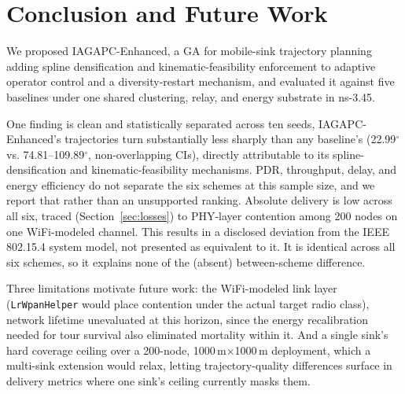\documentclass[runningheads]{llncs}
\begin{document}
\section{Conclusion and Future Work}
\label{sec:conclusion}

We proposed IAGAPC-Enhanced, a GA for mobile-sink trajectory planning
adding spline densification and kinematic-feasibility enforcement to
adaptive operator control and a diversity-restart mechanism, and evaluated
it against five baselines under one shared clustering, relay, and energy
substrate in ns-3.45.

One finding is clean and statistically separated across ten seeds,
IAGAPC-Enhanced's trajectories turn substantially less sharply than any
baseline's (22.99$^\circ$ vs. 74.81--109.89$^\circ$, non-overlapping CIs),
directly attributable to its spline-densification and
kinematic-feasibility mechanisms. PDR, throughput, delay, and energy
efficiency do not separate the six schemes at this sample size, and we
report that rather than an unsupported ranking. Absolute delivery is low
across all six, traced (Section~\ref{sec:losses}) to PHY-layer contention
among 200 nodes on one WiFi-modeled channel. This results in a disclosed deviation
from the IEEE 802.15.4 system model, not presented as equivalent to it. It
is identical across all six schemes, so it explains none of the (absent)
between-scheme difference.

Three limitations motivate future work: the WiFi-modeled link layer
(\texttt{LrWpanHelper} would place contention under the actual target radio
class), network lifetime unevaluated at this horizon, since the energy
recalibration needed for tour survival also eliminated mortality within it. And a single sink's hard coverage ceiling over a 200-node,
1000\,m$\times$1000\,m deployment, which a multi-sink extension would
relax, letting trajectory-quality differences surface in delivery metrics
where one sink's ceiling currently masks them.



\end{document}
